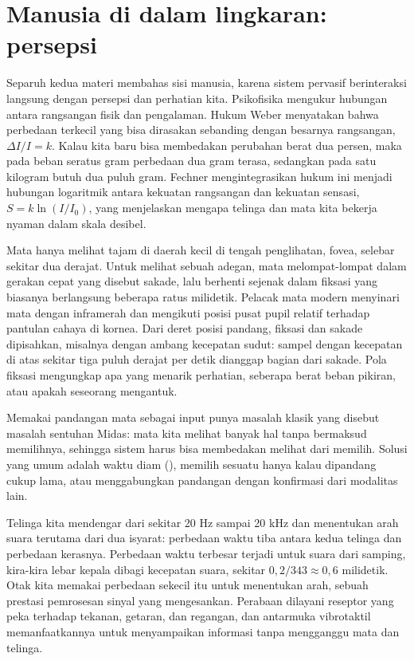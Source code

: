 \section{Manusia di dalam lingkaran: persepsi}

Separuh kedua materi membahas sisi manusia, karena sistem pervasif berinteraksi langsung dengan persepsi dan perhatian
kita. Psikofisika mengukur hubungan antara rangsangan fisik dan pengalaman. Hukum Weber menyatakan bahwa perbedaan
terkecil yang bisa dirasakan sebanding dengan besarnya rangsangan, $\Delta I/I=k$. Kalau kita baru bisa membedakan
perubahan berat dua persen, maka pada beban seratus gram perbedaan dua gram terasa, sedangkan pada satu kilogram
butuh dua puluh gram. Fechner mengintegrasikan hukum ini menjadi hubungan logaritmik antara kekuatan rangsangan dan
kekuatan sensasi, $S=k\ln(I/I_0)$, yang menjelaskan mengapa telinga dan mata kita bekerja nyaman dalam skala desibel.

Mata hanya melihat tajam di daerah kecil di tengah penglihatan, fovea, selebar sekitar dua derajat. Untuk melihat
sebuah adegan, mata melompat-lompat dalam gerakan cepat yang disebut sakade, lalu berhenti sejenak dalam fiksasi yang
biasanya berlangsung beberapa ratus milidetik. Pelacak mata modern menyinari mata dengan inframerah dan mengikuti
posisi pusat pupil relatif terhadap pantulan cahaya di kornea. Dari deret posisi pandang, fiksasi dan sakade
dipisahkan, misalnya dengan ambang kecepatan sudut: sampel dengan kecepatan di atas sekitar tiga puluh derajat per
detik dianggap bagian dari sakade. Pola fiksasi mengungkap apa yang menarik perhatian, seberapa berat beban pikiran,
atau apakah seseorang mengantuk.

Memakai pandangan mata sebagai input punya masalah klasik yang disebut masalah sentuhan Midas: mata kita melihat
banyak hal tanpa bermaksud memilihnya, sehingga sistem harus bisa membedakan melihat dari memilih. Solusi yang umum
adalah waktu diam (), memilih sesuatu hanya kalau dipandang cukup lama, atau menggabungkan pandangan
dengan konfirmasi dari modalitas lain.

Telinga kita mendengar dari sekitar 20 Hz sampai 20 kHz dan menentukan arah suara terutama dari dua isyarat: perbedaan
waktu tiba antara kedua telinga dan perbedaan kerasnya. Perbedaan waktu terbesar terjadi untuk suara dari samping,
kira-kira lebar kepala dibagi kecepatan suara, sekitar $0{,}2/343\approx0{,}6$ milidetik. Otak kita memakai perbedaan
sekecil itu untuk menentukan arah, sebuah prestasi pemrosesan sinyal yang mengesankan. Perabaan dilayani reseptor yang
peka terhadap tekanan, getaran, dan regangan, dan antarmuka vibrotaktil memanfaatkannya untuk menyampaikan informasi
tanpa mengganggu mata dan telinga.

